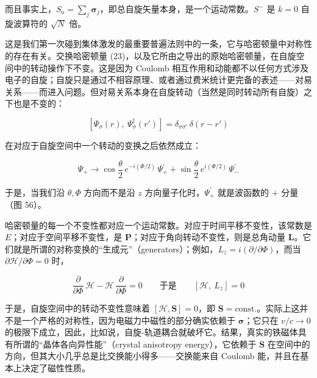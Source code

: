 而且事实上，$S_{\mathrm{o}} = \sum_{j}\boldsymbol{\sigma}_{j}$，即总自旋矢量本身，是一个运动常数。$S^{-}$ 是 $k=0$ 自旋波算符的 $\sqrt{N}$ 倍。

这是我们第一次碰到集体激发的最重要普遍法则中的一条，它与哈密顿量中对称性的存在有关。交换哈密顿量 (23)，以及它所由之导出的原始哈密顿量，在自旋空间中的转动操作下不变。这是因为 Coulomb 相互作用和动能都不以任何方式涉及电子的自旋；自旋只是通过不相容原理、或者通过费米统计更完备的表述——对易关系——而进入问题。但对易关系本身在自旋转动（当然是同时转动所有自旋）之下也是不变的：

\begin{equation*}
\left[\Psi_{\sigma}(r),\ \Psi^{\dagger}_{\sigma}(r')\right] = \delta_{\sigma\sigma'}\,\delta(r-r')
\end{equation*}

在对应于自旋空间中一个转动的变换之后依然成立：

\begin{equation*}
\Psi_{+} \rightarrow \cos\frac{\theta}{2}\, e^{-i(\Phi/2)}\,\Psi^{'}_{+} + \sin\frac{\theta}{2}\, e^{i(\Phi/2)}\,\Psi^{'}_{-}
\end{equation*}

于是，当我们沿 $\theta,\Phi$ 方向而不是沿 $z$ 方向量子化时，$\Psi^{'}_{+}$ 就是波函数的 $+$ 分量（图 56）。

哈密顿量的每一个不变性都对应一个运动常数。对应于时间平移不变性，该常数是 $E$；对应于空间平移不变性，是 $\mathbf{P}$；对应于角向转动不变性，则是总角动量 $\mathbf{L}$。它们就是所谓的对称变换的“生成元”（generators）；例如，$L_{z} = i(\partial/\partial\Phi)$，而当 $\partial\mathcal{H}/\partial\Phi = 0$ 时，

\begin{equation*}
\frac{\partial}{\partial\Phi}\,\mathcal{H} - \mathcal{H}\,\frac{\partial}{\partial\Phi} = 0 \qquad \text{于是} \qquad \left[\mathcal{H},\ L_{z}\right] = 0
\end{equation*}

于是，自旋空间中的转动不变性意味着 $[\mathcal{H},\mathbf{S}] = 0$，即 $\mathbf{S} = \text{const.}$。实际上这并不是一个严格的对称性，因为电磁力中磁性的部分确实依赖于 $\boldsymbol{\sigma}$；它只在 $v/c \rightarrow 0$ 的极限下成立，因此，比如说，自旋-轨道耦合就破坏它。结果，真实的铁磁体具有所谓的“晶体各向异性能”（crystal anisotropy energy），它依赖于 $\mathbf{S}$ 在空间中的方向，但其大小几乎总是比交换能小得多——交换能来自 Coulomb 能，并且在基本上决定了磁性性质。

